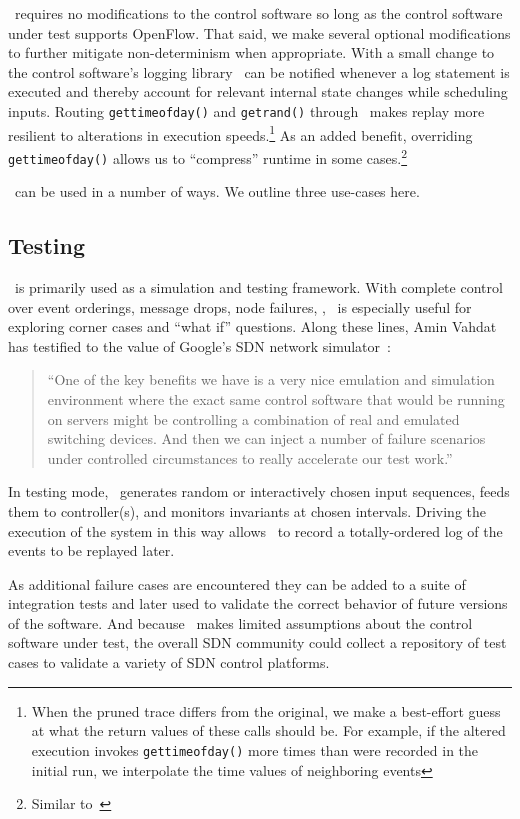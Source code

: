 \projectname~requires
no modifications to the control software so long as the control software under test supports OpenFlow.
That said, we make several optional
modifications to further mitigate non-determinism when appropriate. With a
small change to the control software's logging library \projectname~can be
notified whenever a log statement is executed
and thereby account for relevant internal state changes while scheduling inputs.
Routing {\tt gettimeofday()} and {\tt getrand()} through
\projectname~makes replay more resilient to alterations in execution
speeds.\footnote{When the pruned trace differs from the original, we make a
best-effort guess at what the return values of these calls should be. For example,
if the altered execution invokes {\tt gettimeofday()} more times than were recorded
in the initial run, we interpolate the time values of neighboring events}
As an added benefit, overriding {\tt gettimeofday()} allows us to ``compress''
runtime in some cases.\footnote{Similar to~\cite{Gupta06toinfinity}}

\projectname~can be used in a number of ways. We outline three use-cases here.

\subsection{Testing}

\projectname~is primarily used as a simulation and testing framework.
With complete control over event orderings, message drops, node
failures, \etc, \projectname~is especially useful for exploring corner cases
and ``what if'' questions. Along these lines, Amin Vahdat
has testified to the value of Google's SDN network simulator~\cite{vadhat}:
\begin{quote}
``One of the key benefits we have is a very nice emulation and
simulation environment where the exact same control software that would be
running on servers might be controlling a combination of real and emulated
switching devices. And then we can inject a number of failure scenarios under
controlled circumstances to really accelerate our test work.''
\end{quote}

In testing mode, \projectname~generates random or interactively chosen input
sequences, feeds them to controller(s), and monitors invariants at chosen
intervals. Driving the
execution of the system in this way allows \projectname~to record a
totally-ordered log of the events to be replayed later.

As additional failure cases are encountered they can be added
to a suite of integration tests and later used to validate the correct
behavior of future versions of the software. And because \projectname~makes
limited assumptions about the control software under test, the overall SDN community
could collect a repository of test cases to validate a variety of
SDN control platforms.

